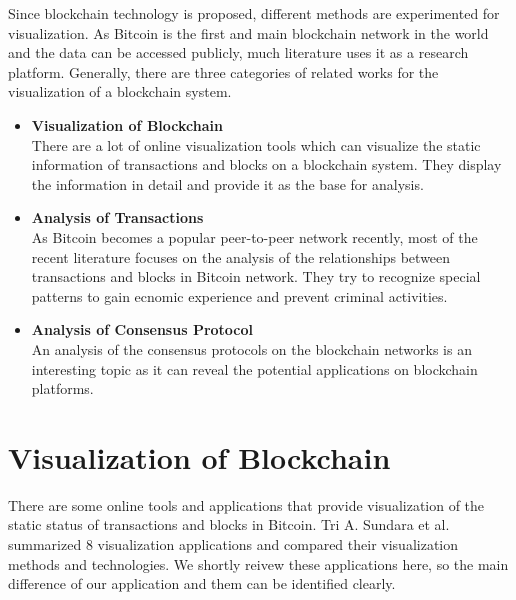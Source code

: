 Since blockchain technology is proposed, different methods are experimented for visualization. As Bitcoin is the first and main blockchain network in the world and the data can be accessed publicly, much literature uses it as a research platform. Generally, there are three categories of related works for the visualization of a blockchain system.
\begin{itemize}
    \item \textbf{Visualization of Blockchain} \\
        There are a lot of online visualization tools which can visualize the static information of transactions and blocks on a blockchain system. They display the information in detail and provide it as the base for analysis.
    \item \textbf{Analysis of Transactions} \\
        As Bitcoin becomes a popular peer-to-peer network recently, most of the recent literature focuses on the analysis of the relationships between transactions and blocks in Bitcoin network. They try to recognize special patterns to gain ecnomic experience and prevent criminal activities.
    \item \textbf{Analysis of Consensus Protocol} \\
        An analysis of the consensus protocols on the blockchain networks is an interesting topic as it can reveal the potential applications on blockchain platforms.
\end{itemize}

\section{Visualization of Blockchain}

There are some online tools and applications that provide visualization of the static status of transactions and blocks in Bitcoin. Tri A. Sundara et al. \cite{Sundara2017} summarized 8 visualization applications and compared their visualization methods and technologies. We shortly reivew these applications here, so the main difference of our application and them can be identified clearly.
\clearpage

